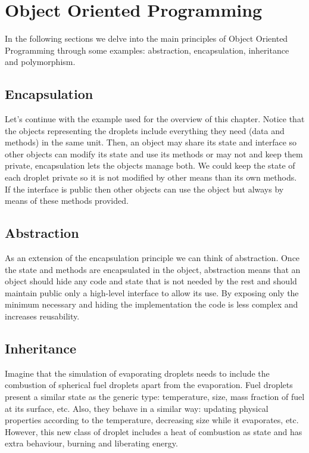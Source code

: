 \chapter{Object Oriented Programming} 

\vspace{-1cm}
In the following sections we delve into the main principles of Object Oriented Programming through some examples: 
abstraction, encapsulation, inheritance and polymorphism. 


    \section{Encapsulation}
    
Let's continue with the example used for the overview of this chapter. 
Notice that the objects representing the droplets include everything they need (data and methods) in the same unit. 
Then, an object may share its state and interface so other objects can modify its state and use its methods 
or may not and keep them private, encapsulation lets the objects manage both. 
We could keep the state of each droplet private so it is not modified by other means than its own methods.  
If the interface is public then other objects can use the object but always by means of these methods provided.  
      
   
    \section{Abstraction}

As an extension of the encapsulation principle we can think of abstraction. 
Once the state and methods are encapsulated in the object, abstraction means that an object 
should hide any code and state that is not needed by the rest and 
should maintain public only a high-level interface to allow its use.
By exposing only the minimum necessary and hiding the implementation the code is less complex 
and increases reusability.


    

    \section{Inheritance}

Imagine that the simulation of evaporating droplets needs to include the combustion of spherical fuel droplets apart from the evaporation.
Fuel droplets present a similar state as the generic type: temperature, size, mass fraction of fuel at its surface, etc.
Also, they behave in a similar way: updating physical properties according to the temperature, decreasing size while it evaporates, etc. 
However, this new class of droplet includes a heat of combustion as state and has extra behaviour, burning and liberating energy. 

